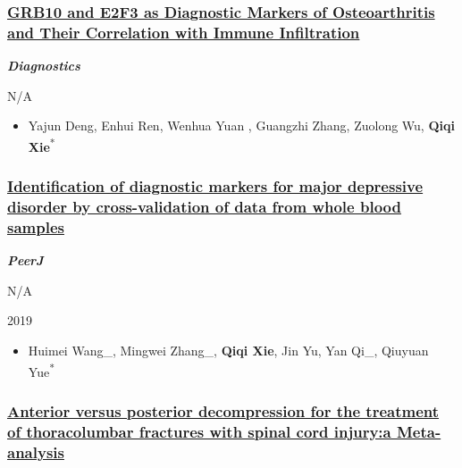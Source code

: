 \documentclass[
]{article}
\providecommand{\tightlist}{%
  \setlength{\itemsep}{0pt}\setlength{\parskip}{0pt}}
\begin{document}
\hypertarget{grb10-and-e2f3-as-diagnostic-markers-of-osteoarthritis-and-their-correlation-with-immune-infiltration}{%
\subsubsection{\texorpdfstring{\href{https://doi.org/10.3390/diagnostics10030171}{GRB10
and E2F3 as Diagnostic Markers of Osteoarthritis and Their Correlation
with Immune
Infiltration}}{GRB10 and E2F3 as Diagnostic Markers of Osteoarthritis and Their Correlation with Immune Infiltration}}\label{grb10-and-e2f3-as-diagnostic-markers-of-osteoarthritis-and-their-correlation-with-immune-infiltration}}

\textbf{\emph{Diagnostics}}

N/A

\begin{itemize}
\tightlist
\item
  Yajun Deng, Enhui Ren, Wenhua Yuan , Guangzhi Zhang, Zuolong Wu,
  \textbf{Qiqi Xie}\textsuperscript{*}
\end{itemize}

\hypertarget{identification-of-diagnostic-markers-for-major-depressive-disorder-by-cross-validation-of-data-from-whole-blood-samples}{%
\subsubsection{\texorpdfstring{\href{https://peerj.com/articles/7171/}{Identification
of diagnostic markers for major depressive disorder by cross-validation
of data from whole blood
samples}}{Identification of diagnostic markers for major depressive disorder by cross-validation of data from whole blood samples}}\label{identification-of-diagnostic-markers-for-major-depressive-disorder-by-cross-validation-of-data-from-whole-blood-samples}}

\textbf{\emph{PeerJ}}

N/A

2019

\begin{itemize}
\tightlist
\item
  Huimei Wang\_, Mingwei Zhang\_, \textbf{Qiqi Xie}, Jin Yu, Yan Qi\_,
  Qiuyuan Yue\textsuperscript{*}
\end{itemize}

\hypertarget{anterior-versus-posterior-decompression-for-the-treatment-of-thoracolumbar-fractures-with-spinal-cord-injurya-meta-analysis}{%
\subsubsection{\texorpdfstring{\href{https://doi.org/10.3969/j.issn.1003-0034.2019.03.015}{Anterior
versus posterior decompression for the treatment of thoracolumbar
fractures with spinal cord injury:a
Meta-analysis}}{Anterior versus posterior decompression for the treatment of thoracolumbar fractures with spinal cord injury:a Meta-analysis}}\label{anterior-versus-posterior-decompression-for-the-treatment-of-thoracolumbar-fractures-with-spinal-cord-injurya-meta-analysis}}
\end{document}

